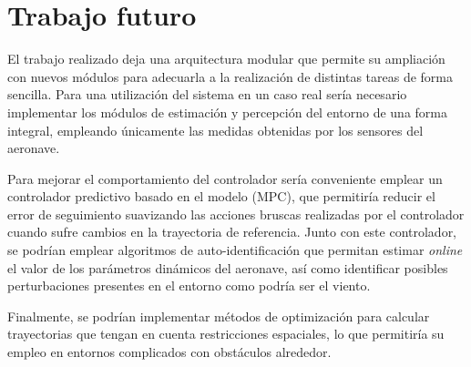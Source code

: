 \section{Trabajo futuro}

El trabajo realizado deja una arquitectura modular que permite su ampliación con nuevos módulos para adecuarla a la realización de distintas tareas de forma sencilla. Para una utilización del sistema en un caso real sería necesario implementar los módulos de estimación y percepción del entorno de una forma integral, empleando únicamente las medidas obtenidas por los sensores del aeronave. 

Para mejorar el comportamiento del controlador sería conveniente emplear un controlador predictivo basado en el modelo (MPC), que permitiría reducir el error de seguimiento suavizando las acciones bruscas realizadas por el controlador cuando sufre cambios en la trayectoria de referencia. Junto con este controlador, se podrían emplear algoritmos de auto-identificación que permitan estimar \textit{online} el valor de los parámetros dinámicos del aeronave, así como identificar posibles perturbaciones presentes en el entorno como podría ser el viento.

Finalmente, se podrían implementar métodos de optimización para calcular trayectorias que tengan en cuenta restricciones espaciales, lo que permitiría su empleo en entornos complicados con obstáculos alrededor. 











